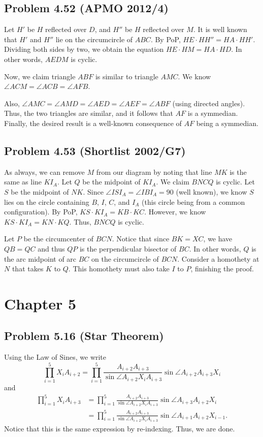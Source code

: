 \documentclass{scrartcl}
\begin{document}
\subsection*{Problem 4.52 (APMO 2012/4)}
Let $H'$ be $H$ reflected over $D$, and $H''$ be $H$ reflected over $M$. It is well known that $H'$ and $H''$ lie on the circumcircle of $ABC$. By PoP, $HE \cdot HH'' = HA \cdot HH'$.
Dividing both sides by two, we obtain the equation $HE \cdot HM = HA \cdot HD$. In other words, $AEDM$ is cyclic.

Now, we claim triangle $ABF$ is similar to triangle $AMC$. We know $\angle ACM = \angle ACB = \angle AFB$.

Also, $\angle AMC = \angle AMD = \angle AED = \angle AEF = \angle ABF$ (using directed angles). Thus, the two triangles are similar, and it follows that $AF$ is a symmedian. 
Finally, the desired result is a well-known consequence of $AF$ being a symmedian.
\subsection*{Problem 4.53 (Shortlist 2002/G7)}
As always, we can remove $M$ from our diagram by noting that line $MK$ is the same as line $KI_A$.
Let $Q$ be the midpoint of $KI_A$. We claim $BNCQ$ is cyclic.
Let $S$ be the midpoint of $NK$. Since $\angle ISI_A = \angle IBI_A = 90$ (well known), we know $S$ lies on the circle containing $B$, $I$, $C$, and $I_A$ (this circle being from a common configuration). By PoP, $KS \cdot KI_A = KB \cdot KC$.
However, we know $KS \cdot KI_A = KN \cdot KQ$. Thus, $BNCQ$ is cyclic.

Let $P$ be the circumcenter of $BCN$. Notice that since $BK = XC$, we have $QB = QC$ and thus $QP$ is the perpendicular bisector of $BC$. In other words, $Q$ is the arc midpoint of arc $BC$ on the circumcircle of $BCN$. Consider a homothety at $N$ that takes $K$ to $Q$. This homothety must also take $I$ to $P$, finishing the proof.
\section*{Chapter 5}
\subsection*{Problem 5.16 (Star Theorem)}
Using the Law of Sines, we write
\[
    \prod_{i = 1}^{5} X_i A_{i + 2} = \prod_{i = 1}^{5} \frac{A_{i + 2}A_{i + 3}}{\sin \angle A_{i+2}X_iA_{i+3}}\sin \angle A_{i+2}A_{i+3}X_i
\]
and
\begin{align*}
    \prod_{i = 1}^{5} X_i A_{i + 3} &= \prod_{i = 1}^{5} \frac{A_{i + 2}A_{i + 3}}{\sin \angle A_{i+2}X_iA_{i+3}}\sin \angle A_{i+3}A_{i+2}X_i \\
    &= \prod_{i = 1}^{5} \frac{A_{i + 2}A_{i + 3}}{\sin \angle A_{i+2}X_iA_{i+3}}\sin \angle A_{i+1}A_{i+2}X_{i-1}.
\end{align*}
Notice that this is the same expression by re-indexing. Thus, we are done.
\end{document}
